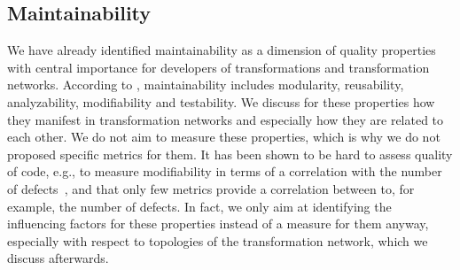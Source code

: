 \subsection{Maintainability}

We have already identified maintainability as a dimension of quality properties with central importance for developers of transformations and transformation networks.
According to \cite{iso25010}, maintainability includes modularity, reusability, analyzability, modifiability and testability.
We discuss for these properties how they manifest in transformation networks and especially how they are related to each other.
We do not aim to measure these properties, which is why we do not proposed specific metrics for them.
It has been shown to be hard to assess quality of code, e.g., to measure modifiability in terms of a correlation with the number of defects~\cite{Gyimothy2005ValidationMetrics-TSE, Yu2002FaultPrediction-ECSMR}, and that only few metrics provide a correlation between to, for example, the number of defects.
In fact, we only aim at identifying the influencing factors for these properties instead of a measure for them anyway, especially with respect to topologies of the transformation network, which we discuss afterwards.

